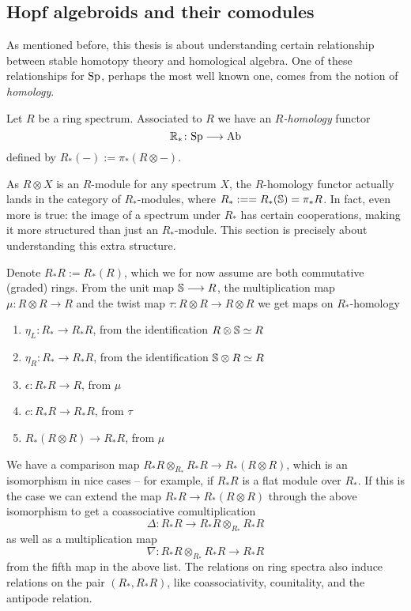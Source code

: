 

\subsection{Hopf algebroids and their comodules}
\label{ch0:ssec:hopf-algebroids-and-their-comodules}

As mentioned before, this thesis is about understanding certain relationship between stable homotopy theory and homological algebra. One of these relationships for $\Sp$, perhaps the most well known one, comes from the notion of \emph{homology}. 

\begin{definition}
    Let $R$ be a ring spectrum. Associated to $R$ we have an \emph{$R$-homology} functor 
    \[\R_* \: \Sp \to \Ab\]
    defined by $R_*(-):= \pi_*(R\otimes -)$. 
\end{definition}

As $R\otimes X$ is an $R$-module for any spectrum $X$, the $R$-homology functor actually lands in the category of $R_*$-modules, where $R_*:= =R_*(\S) = \pi_* R$. In fact, even more is true: the image of a spectrum under $R_*$ has certain cooperations, making it more structured than just an $R_*$-module. This section is precisely about understanding this extra structure. 

\begin{construction}
    Denote $R_*R:= R_*(R)$, which we for now assume are both commutative (graded) rings. From the unit map $\S\longrightarrow R$, the multiplication map $\mu\colon R\otimes R\longrightarrow R$ and the twist map $\tau\colon R\otimes R\longrightarrow R\otimes R$ we get maps on $R_*$-homology
    \begin{enumerate}
        \item $\eta_L\colon R_*\longrightarrow R_*R$, from the identification $R\otimes \S\simeq R$
        \item $\eta_R\colon R_*\longrightarrow R_*R$, from the identification $\S\otimes R\simeq R$
        \item $\epsilon\colon R_*R\longrightarrow R$, from $\mu$
        \item $c\colon R_*R\longrightarrow R_*R$, from $\tau$
        \item $R_*(R\otimes R)\longrightarrow R_*R$, from $\mu$
    \end{enumerate}
    We have a comparison map $R_*R\otimes_{R_*}R_*R\longrightarrow R_*(R\otimes R)$, which is an isomorphism in nice cases -- for example, if $R_*R$ is a flat module over $R_*$. If this is the case we can extend the map $R_*R\longrightarrow R_*(R\otimes R)$ through the above isomorphism to get a coassociative comultiplication
    \[\Delta\colon R_*R\longrightarrow R_*R\otimes_{R_*}R_*R\] 
    as well as a multiplication map 
    \[\nabla\colon R_*R\otimes_{R_*}R_*R\longrightarrow R_*R\]
    from the fifth map in the above list. The relations on ring spectra also induce relations on the pair $(R_*, R_*R)$, like coassociativity, counitality, and the antipode relation.   
\end{construction}

